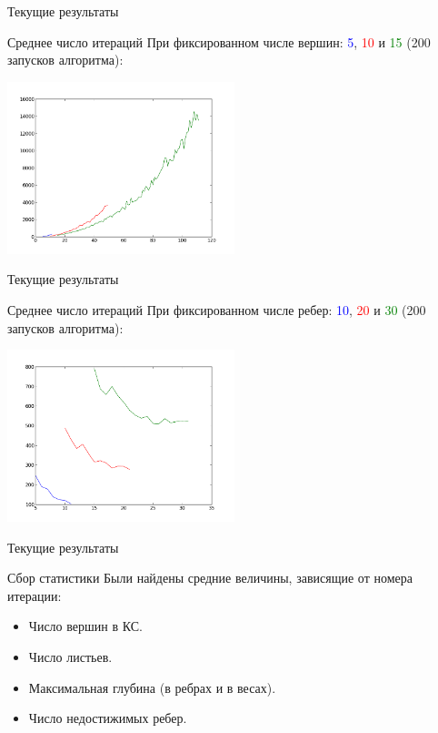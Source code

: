 \documentclass{beamer}
\begin{document}
\begin{frame}{Текущие результаты}
\begin{block}{Среднее число итераций}
При фиксированном числе вершин: \textcolor{blue}{5}, \textcolor{red}{10} и \textcolor{green}{15} (200 запусков алгоритма):
\begin{center}
\includegraphics*[height=5cm]{pic/const_vertexes_20.png}
\end{center}
\end{block}
\end{frame}

\begin{frame}{Текущие результаты}
\begin{block}{Среднее число итераций}
При фиксированном числе ребер: \textcolor{blue}{10}, \textcolor{red}{20} и \textcolor{green}{30} (200 запусков алгоритма):
\begin{center}
\includegraphics*[height=5cm]{pic/const_edges.png}
\end{center}
\end{block}
\end{frame}

\begin{frame}{Текущие результаты}
\begin{block}{Сбор статистики}
Были найдены средние величины, зависящие от номера итерации:
\begin{itemize}
 \item Число вершин в КС.
 \item Число листьев.
 \item Максимальная глубина (в ребрах и в весах).
 \item Число недостижимых ребер.
\end{itemize}
\end{block}
\end{frame}
\end{document}

